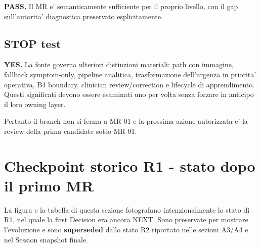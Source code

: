 \documentclass[11pt,a4paper]{article}
\begin{document}
\begin{ddtacore}[title={MR-01 disposition}]
\textbf{PASS.} Il MR e' semanticamente sufficiente per il proprio livello, con il gap sull'autorita' diagnostica preservato esplicitamente.
\end{ddtacore}

\subsection{STOP test}

\begin{ddtacheck}[title={Serve ulteriore significato governato nello scope corrente?}]
\textbf{YES.} La fonte governa ulteriori distinzioni materiali: path con immagine, fallback symptom-only, pipeline analitica, trasformazione dell'urgenza in priorita' operativa, B4 boundary, clinician review/correction e lifecycle di apprendimento. Questi significati devono essere esaminati uno per volta senza forzare in anticipo il loro owning layer.
\end{ddtacheck}

Pertanto il branch non si ferma a MR-01 e la prossima azione autorizzata e' la review della prima candidate \DEC{} sotto MR-01.

\section{Checkpoint storico R1 - stato dopo il primo MR}
\begin{ddtaopen}[title={Snapshot storico preservato}]
La figura e la tabella di questa sezione fotografano intenzionalmente lo stato di R1, nel quale la first Decision era ancora NEXT. Sono preservate per mostrare l'evoluzione e sono \textbf{superseded} dallo stato R2 riportato nelle sezioni A3/A4 e nel Session snapshot finale.
\end{ddtaopen}
\end{document}

